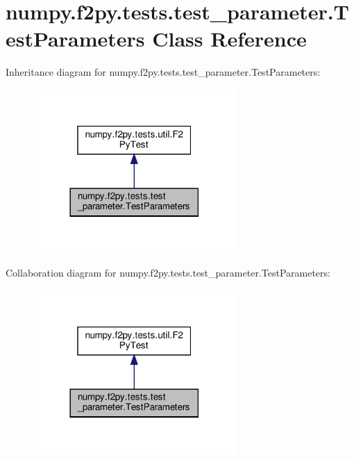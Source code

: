 \hypertarget{classnumpy_1_1f2py_1_1tests_1_1test__parameter_1_1TestParameters}{}\section{numpy.\+f2py.\+tests.\+test\+\_\+parameter.\+Test\+Parameters Class Reference}
\label{classnumpy_1_1f2py_1_1tests_1_1test__parameter_1_1TestParameters}


Inheritance diagram for numpy.\+f2py.\+tests.\+test\+\_\+parameter.\+Test\+Parameters\+:
\nopagebreak
\begin{figure}[H]
\begin{center}
\leavevmode
\includegraphics[width=218pt]{classnumpy_1_1f2py_1_1tests_1_1test__parameter_1_1TestParameters__inherit__graph}
\end{center}
\end{figure}


Collaboration diagram for numpy.\+f2py.\+tests.\+test\+\_\+parameter.\+Test\+Parameters\+:
\nopagebreak
\begin{figure}[H]
\begin{center}
\leavevmode
\includegraphics[width=218pt]{classnumpy_1_1f2py_1_1tests_1_1test__parameter_1_1TestParameters__coll__graph}
\end{center}
\end{figure}
